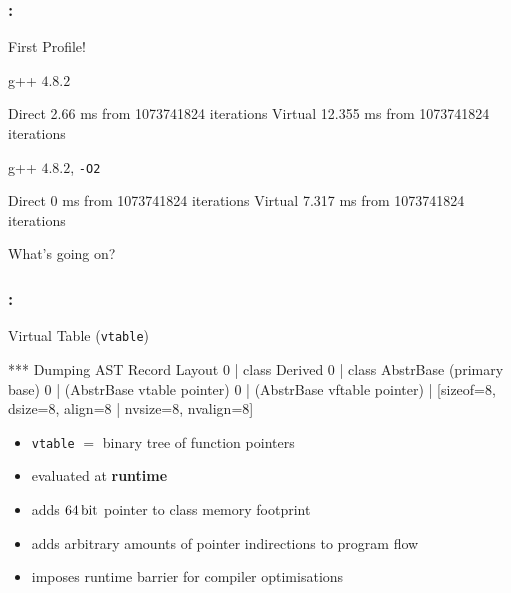 \documentclass[9pt,xcolor=table]{beamer}
\begin{document}
\begin{frame}[fragile]
\frametitle{\insertsectionhead{}: \insertsubsectionhead{}}
\vfill
\begin{center}
  \huge
  First Profile!
\end{center}
\vfill
\begin{block}{g++ $4.8.2$}
  \begin{semiverbatim}
    Direct          2.66 ms from 1073741824 iterations
    Virtual         12.355 ms from 1073741824 iterations
  \end{semiverbatim}
\end{block}
\pause
\begin{block}{g++ $4.8.2$, \texttt{-O2}}
  \begin{semiverbatim}
    Direct  	    0 ms from 1073741824 iterations 
    Virtual 	7.317 ms from 1073741824 iterations
  \end{semiverbatim}
\end{block}
\pause
\vfill
\begin{center}
  \huge
  What's going on?
\end{center}
\vfill
\end{frame}


\begin{frame}[fragile]
\frametitle{\insertsectionhead{}: \insertsubsectionhead{}}
\begin{block}{Virtual Table (\texttt{vtable})}
  \begin{semiverbatim}
*** Dumping AST Record Layout
   0 | class Derived
   0 |   class AbstrBase (primary base)
   0 |     (AbstrBase vtable pointer)
   0 |     (AbstrBase vftable pointer)
     | [sizeof=8, dsize=8, align=8
     |  nvsize=8, nvalign=8]
  \end{semiverbatim}
\end{block}

\begin{itemize}
\item \texttt{vtable} $=$ binary tree of function pointers
\item evaluated at \textbf{runtime}
\item adds $\unit[64]{bit}$ pointer to class memory footprint
\item adds arbitrary amounts of pointer indirections to program flow
\item imposes runtime barrier for compiler optimisations
\end{itemize}

\end{frame}
\end{document}

